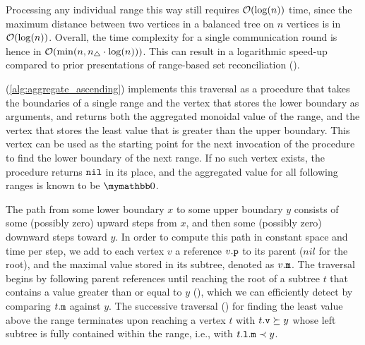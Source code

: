 \documentclass[conference]{IEEEtran}
\begin{document}
Processing any individual range this way still requires $\mathcal{O}(\log(n))$ time, since the maximum distance between two vertices in a balanced tree on $n$ vertices is in $\mathcal{O}(\log(n))$. Overall, the time complexity for a single communication round is hence in $\mathcal{O}(\min(n, n_{\triangle} \cdot \log(n)))$. This can result in a logarithmic speed-up compared to prior presentations of range-based set reconciliation (\cite{chen1999prototype}\cite{shang2017survey}).


 (\cref{alg:aggregate_ascending}) implements this traversal as a procedure that takes the boundaries of a single range and the vertex that stores the lower boundary as arguments, and returns both the aggregated monoidal value of the range, and the vertex that stores the least value that is greater than the upper boundary. This vertex can be used as the starting point for the next invocation of the procedure to find the lower boundary of the next range. If no such vertex exists, the procedure returns $\mathtt{nil}$ in its place, and the aggregated value for all following ranges is known to be $\neutraladd$.

The path from some lower boundary $x$ to some upper boundary $y$ consists of some (possibly zero) upward steps from $x$, and then some (possibly zero) downward steps toward $y$. In order to compute this path in constant space and time per step, we add to each vertex $v$ a reference ${v}\mathtt{.p}$ to its parent ($nil$ for the root), and the maximal value stored in its subtree, denoted as ${v}\mathtt{.m}$. The traversal begins by following parent references until reaching the root of a subtree $t$ that contains a value greater than or equal to $y$ (), which we can efficiently detect by comparing ${t}\mathtt{.m}$ against $y$. The successive traversal () for finding the least value above the range terminates upon reaching a vertex $t$ with ${t}\mathtt{.v} \succeq y$ whose left subtree is fully contained within the range, i.e., with ${{t}\mathtt{.l}}\mathtt{.m} \prec y$.
\end{document}
